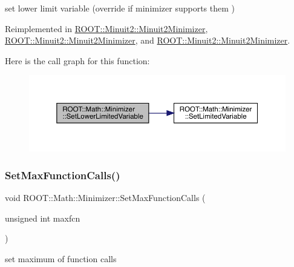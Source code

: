 set lower limit variable (override if minimizer supports them ) 



Reimplemented in \mbox{\hyperlink{classROOT_1_1Minuit2_1_1Minuit2Minimizer_af38926946e36f7030cfc1c298ab9b222}{R\+O\+O\+T\+::\+Minuit2\+::\+Minuit2\+Minimizer}}, \mbox{\hyperlink{classROOT_1_1Minuit2_1_1Minuit2Minimizer_af38926946e36f7030cfc1c298ab9b222}{R\+O\+O\+T\+::\+Minuit2\+::\+Minuit2\+Minimizer}}, and \mbox{\hyperlink{classROOT_1_1Minuit2_1_1Minuit2Minimizer_af38926946e36f7030cfc1c298ab9b222}{R\+O\+O\+T\+::\+Minuit2\+::\+Minuit2\+Minimizer}}.

Here is the call graph for this function\+:
\nopagebreak
\begin{figure}[H]
\begin{center}
\leavevmode
\includegraphics[width=350pt]{dc/dc4/classROOT_1_1Math_1_1Minimizer_a0fed20bdc58d05ce2b92d2bf47594dfb_cgraph}
\end{center}
\end{figure}
\mbox{\label{classROOT_1_1Math_1_1Minimizer_aabbadaa76bb5723fcaec0eb7d40850b2}} 
\subsubsection{\texorpdfstring{SetMaxFunctionCalls()}{SetMaxFunctionCalls()}\hspace{0.1cm}{\footnotesize\ttfamily [1/3]}}
{\footnotesize\ttfamily void R\+O\+O\+T\+::\+Math\+::\+Minimizer\+::\+Set\+Max\+Function\+Calls (\begin{DoxyParamCaption}\item[{unsigned int}]{maxfcn }\end{DoxyParamCaption})\hspace{0.3cm}{\ttfamily [inline]}}



set maximum of function calls 

